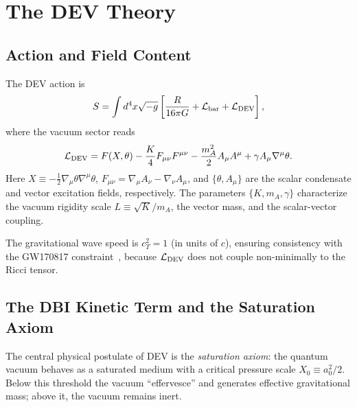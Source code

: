 \documentclass[aps,prd,twocolumn,showpacs,superscriptaddress]{revtex4-2}
\newcommand{\Lbar}{\mathcal{L}}
\newcommand{\aO}{a_0}
\newcommand{\Xzero}{X_0}
\begin{document}
\section{The DEV Theory}
\label{sec:theory}

\subsection{Action and Field Content}

The DEV action is
\begin{equation}
  S = \int d^4x\sqrt{-g}\left[
    \frac{R}{16\pi G}
    + \Lbar_{\rm bar}
    + \Lbar_{\rm DEV}
  \right],
  \label{eq:action}
\end{equation}
where the vacuum sector reads
\begin{equation}
  \Lbar_{\rm DEV} = F(X,\theta)
    - \frac{K}{4}F_{\mu\nu}F^{\mu\nu}
    - \frac{m_A^2}{2}A_\mu A^\mu
    + \gamma A_\mu\nabla^\mu\theta.
  \label{eq:LDEV}
\end{equation}
Here $X \equiv -\frac{1}{2}\nabla_\mu\theta\nabla^\mu\theta$,
$F_{\mu\nu} = \nabla_\mu A_\nu - \nabla_\nu A_\mu$, and
$\{\theta, A_\mu\}$ are the scalar condensate and vector excitation fields,
respectively. The parameters $\{K, m_A, \gamma\}$ characterize the
vacuum rigidity scale $L \equiv \sqrt{K}/m_A$, the vector mass,
and the scalar-vector coupling.

The gravitational wave speed is $c_T^2 = 1$ (in units of $c$),
ensuring consistency with the GW170817 constraint~\cite{GW170817},
because $\Lbar_{\rm DEV}$ does not couple non-minimally to the
Ricci tensor.

\subsection{The DBI Kinetic Term and the Saturation Axiom}

The central physical postulate of DEV is the \emph{saturation axiom}:
the quantum vacuum behaves as a saturated medium with a critical
pressure scale $\Xzero \equiv \aO^2/2$.
Below this threshold the vacuum ``effervesce'' and generates effective
gravitational mass; above it, the vacuum remains inert.
\end{document}
